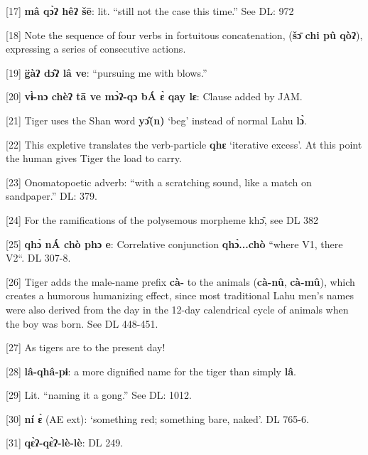 {[17] }{\textbf{mâ qɔ̀ʔ hêʔ šē}}{: lit. ``still not
the case this time.'' See DL: 972}

{[18] Note the sequence of four verbs in fortuitous concatenation, (}{\textbf{šɔ̄
chi pû qòʔ}}{), expressing a series of consecutive actions.}

{[19]}{\textbf{ g̈àʔ  dɔ̂ʔ  lâ ve}}{: ``pursuing me
with blows.''}

{[20] }{\textbf{ vɨ̀-nɔ chèʔ tā ve mɔ̀ʔ-qɔ bÁ ɛ̀ qay
lɛ}}{: Clause added by JAM.}

{[21] Tiger uses the Shan word }{\textbf{yɔ̂(n)}}{ `beg'
instead of normal Lahu }{\textbf{lɔ̀}}{. }

{[22] This expletive translates the verb-particle }{\textbf{qhɛ}}{
`iterative excess'. At this point the human gives   Tiger the load to carry.}

{[23] Onomatopoetic adverb: ``with a scratching sound, like a match on sandpaper.''
DL: 379.}

{[24]  For the ramifications of the polysemous morpheme khɔ̂,}{
}{see DL 382  }

{[25] }{\textbf{ qhɔ̀ nÁ chò phɔ e}}{: Correlative conjunction
}{\textbf{qhɔ̀...chò }}{``where V}1{, there V}{\large{}2}{``.
DL 307-8.}

{[26] Tiger adds the male-name prefix }{\textbf{cà-}}{ to
the animals (}{\textbf{cà-nû}}{, }{\textbf{cà-mû}}{),
which creates a humorous humanizing effect, since most traditional Lahu men's names
were also derived from the day in the 12-day calendrical cycle of animals when
the boy was born. See DL 448-451.}

{[27] As tigers are to the present day!}

{[28] }{\textbf{lâ-qhâ-pɨ}}{: a more dignified name for
the tiger than simply }{\textbf{lâ}}{.}

{[29] Lit. ``naming it a gong.'' See DL: 1012.}

{[30] }{\textbf{ní ɛ̀}}{ (AE ext): `something red; something
bare, naked'. DL 765-6.}

{[31] }{\textbf{qɛ̀ʔ-qɛ̀ʔ-lè-lè}}{: DL 249.}


